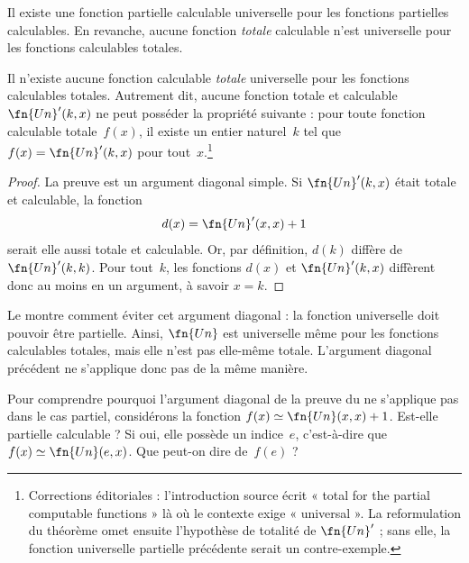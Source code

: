 \documentclass[../../../include/open-logic-section]{subfiles}
\begin{document}

Il existe une fonction partielle calculable
universelle pour les fonctions partielles
calculables. En revanche, aucune fonction
\emph{totale} calculable n'est universelle
pour les fonctions calculables totales.

\begin{thm}
Il n'existe aucune fonction calculable
\emph{totale} universelle pour les fonctions
calculables totales. Autrement dit, aucune
fonction totale et calculable
$\fn{Un}'(k,x)$ ne peut posséder la propriété
suivante : pour toute fonction calculable
totale~$f(x)$, il existe un entier naturel~$k$
tel que $f(x)=\fn{Un}'(k,x)$ pour tout~$x$.\footnote{Corrections éditoriales : l'introduction source écrit « total for the partial computable functions » là où le contexte exige « universal ». La reformulation du théorème omet ensuite l'hypothèse de totalité de $\fn{Un}'$ ; sans elle, la fonction universelle partielle précédente serait un contre-exemple.}
\end{thm}

\begin{proof}
La preuve est un argument diagonal simple.
Si $\fn{Un}'(k,x)$ était totale et calculable,
la fonction
\[
d(x) = \fn{Un}'(x, x) + 1
\]
serait elle aussi totale et calculable.
Or, par définition, $d(k)$ diffère de
$\fn{Un}'(k,k)$. Pour tout~$k$, les fonctions
$d(x)$ et $\fn{Un}'(k,x)$ diffèrent donc au
moins en un argument, à savoir $x=k$.
\end{proof}

\begin{explain}
Le
 montre comment
éviter cet argument diagonal : la fonction
universelle doit pouvoir être partielle.
Ainsi, $\fn{Un}$ est universelle même pour
les fonctions calculables totales, mais elle
n'est pas elle-même totale. L'argument
diagonal précédent ne s'applique donc pas
de la même manière.
\end{explain}

\begin{prob}
  Pour comprendre pourquoi l'argument diagonal
  de la preuve du
   ne s'applique pas dans
  le cas partiel, considérons la fonction
  $f(x) \simeq \fn{Un}(x,x)+1$.
  Est-elle partielle calculable ? Si oui,
  elle possède un indice~$e$, c'est-à-dire
  que $f(x) \simeq \fn{Un}(e,x)$.
  Que peut-on dire de~$f(e)$ ?
\end{prob}
\end{document}
